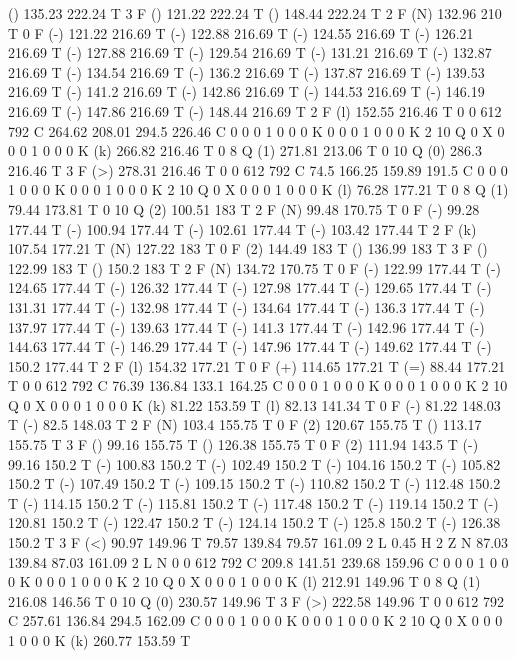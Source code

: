 () 135.23 222.24 T
3 F
() 121.22 222.24 T
() 148.44 222.24 T
2 F
(N) 132.96 210 T
0 F
(-) 121.22 216.69 T
(-) 122.88 216.69 T
(-) 124.55 216.69 T
(-) 126.21 216.69 T
(-) 127.88 216.69 T
(-) 129.54 216.69 T
(-) 131.21 216.69 T
(-) 132.87 216.69 T
(-) 134.54 216.69 T
(-) 136.2 216.69 T
(-) 137.87 216.69 T
(-) 139.53 216.69 T
(-) 141.2 216.69 T
(-) 142.86 216.69 T
(-) 144.53 216.69 T
(-) 146.19 216.69 T
(-) 147.86 216.69 T
(-) 148.44 216.69 T
2 F
(l) 152.55 216.46 T
0 0 612 792 C
264.62 208.01 294.5 226.46 C
0 0 0 1 0 0 0 K
0 0 0 1 0 0 0 K
2 10 Q
0 X
0 0 0 1 0 0 0 K
(k) 266.82 216.46 T
0 8 Q
(1) 271.81 213.06 T
0 10 Q
(0) 286.3 216.46 T
3 F
(>) 278.31 216.46 T
0 0 612 792 C
74.5 166.25 159.89 191.5 C
0 0 0 1 0 0 0 K
0 0 0 1 0 0 0 K
2 10 Q
0 X
0 0 0 1 0 0 0 K
(l) 76.28 177.21 T
0 8 Q
(1) 79.44 173.81 T
0 10 Q
(2) 100.51 183 T
2 F
(N) 99.48 170.75 T
0 F
(-) 99.28 177.44 T
(-) 100.94 177.44 T
(-) 102.61 177.44 T
(-) 103.42 177.44 T
2 F
(k) 107.54 177.21 T
(N) 127.22 183 T
0 F
(2) 144.49 183 T
() 136.99 183 T
3 F
() 122.99 183 T
() 150.2 183 T
2 F
(N) 134.72 170.75 T
0 F
(-) 122.99 177.44 T
(-) 124.65 177.44 T
(-) 126.32 177.44 T
(-) 127.98 177.44 T
(-) 129.65 177.44 T
(-) 131.31 177.44 T
(-) 132.98 177.44 T
(-) 134.64 177.44 T
(-) 136.3 177.44 T
(-) 137.97 177.44 T
(-) 139.63 177.44 T
(-) 141.3 177.44 T
(-) 142.96 177.44 T
(-) 144.63 177.44 T
(-) 146.29 177.44 T
(-) 147.96 177.44 T
(-) 149.62 177.44 T
(-) 150.2 177.44 T
2 F
(l) 154.32 177.21 T
0 F
(+) 114.65 177.21 T
(=) 88.44 177.21 T
0 0 612 792 C
76.39 136.84 133.1 164.25 C
0 0 0 1 0 0 0 K
0 0 0 1 0 0 0 K
2 10 Q
0 X
0 0 0 1 0 0 0 K
(k) 81.22 153.59 T
(l) 82.13 141.34 T
0 F
(-) 81.22 148.03 T
(-) 82.5 148.03 T
2 F
(N) 103.4 155.75 T
0 F
(2) 120.67 155.75 T
() 113.17 155.75 T
3 F
() 99.16 155.75 T
() 126.38 155.75 T
0 F
(2) 111.94 143.5 T
(-) 99.16 150.2 T
(-) 100.83 150.2 T
(-) 102.49 150.2 T
(-) 104.16 150.2 T
(-) 105.82 150.2 T
(-) 107.49 150.2 T
(-) 109.15 150.2 T
(-) 110.82 150.2 T
(-) 112.48 150.2 T
(-) 114.15 150.2 T
(-) 115.81 150.2 T
(-) 117.48 150.2 T
(-) 119.14 150.2 T
(-) 120.81 150.2 T
(-) 122.47 150.2 T
(-) 124.14 150.2 T
(-) 125.8 150.2 T
(-) 126.38 150.2 T
3 F
(<) 90.97 149.96 T
79.57 139.84 79.57 161.09 2 L
0.45 H
2 Z
N
87.03 139.84 87.03 161.09 2 L
N
0 0 612 792 C
209.8 141.51 239.68 159.96 C
0 0 0 1 0 0 0 K
0 0 0 1 0 0 0 K
2 10 Q
0 X
0 0 0 1 0 0 0 K
(l) 212.91 149.96 T
0 8 Q
(1) 216.08 146.56 T
0 10 Q
(0) 230.57 149.96 T
3 F
(>) 222.58 149.96 T
0 0 612 792 C
257.61 136.84 294.5 162.09 C
0 0 0 1 0 0 0 K
0 0 0 1 0 0 0 K
2 10 Q
0 X
0 0 0 1 0 0 0 K
(k) 260.77 153.59 T
